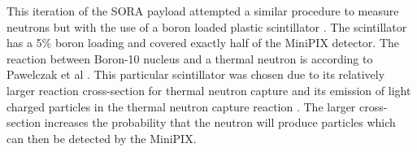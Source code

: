 This iteration of the SORA payload attempted a similar procedure to measure neutrons but with the use of a boron loaded plastic scintillator \cite{BoronScintillator}.
The scintillator has a 5\% boron loading and covered exactly half of the MiniPIX detector.
The reaction between Boron-10 nucleus and a thermal neutron is  according to Pawelczak et al \cite{Pawelczak}.
This particular scintillator was chosen due to its relatively larger reaction cross-section for thermal neutron capture and its emission of light charged particles in the thermal neutron capture reaction \cite{Pawelczak}.
The larger cross-section increases the probability that the neutron will produce particles which can then be detected by the MiniPIX.